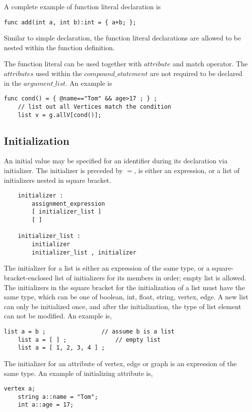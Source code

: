 \documentclass[letterpaper,12pt]{article}
\begin{document}
A complete example of function literal declaration is
\begin{lstlisting}[frame=none]
	func add(int a, int b):int = { a+b; };
\end{lstlisting}	 

Similar to simple declaration, the function literal declarations are allowed to be nested within the function definition. \newline

The function literal can be used together with $attribute$ and match operator. The $attributes$ used within the $compound\_statement$ are not required to be declared in the $argument\_list$. An example is
\begin{lstlisting}[frame=none] 
	func cond() = { @name=="Tom" && age>17 ; } ;
	// list out all Vertices match the condition
	list v = g.allV[cond()];
\end{lstlisting}

\subsection{Initialization}
An initial value may be specified for an identifier during its declaration via initializer. The initializer is preceded by $=$, is either an expression, or a list of initializers nested in square bracket.
\begin{lstlisting}
	initializer :
		assignment_expression
		[ initializer_list ]
		[ ]

	initializer_list :
		initializer
		initializer_list , initializer
\end{lstlisting}
The initializer for a list is either an expression of the same type, or a square-bracket-enclosed list of initializers for its members in order; empty list is allowed. The initializers in the square bracket for the initialization of a list must have the same type, which can be one of boolean, int, float, string, vertex, edge. A new list can only be initialized once, and after the initialization, the type of list element can not be modified. An example is,
\begin{lstlisting}[frame=none]
	list a = b ; 				// assume b is a list
	list a = [ ] ;				// empty list
	list a = [ 1, 2, 3, 4 ] ;	
\end{lstlisting}

The initializer for an attribute of vertex, edge or graph is an expression of the same type. An example of initializing attribute is,
\begin{lstlisting}[frame=none]
	vertex a;
	string a::name = "Tom";
	int a::age = 17;
\end{lstlisting}
\end{document}
